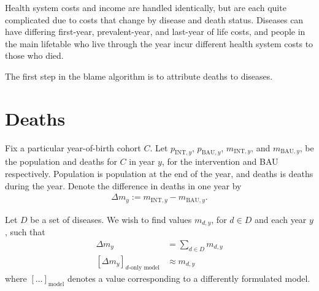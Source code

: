 \documentclass[]{article}
\begin{document}
Health system costs and income are handled identically, but are each quite complicated due to costs that change by disease and death status. Diseases can have differing first-year, prevalent-year, and last-year of life costs, and people in the main lifetable who live through the year incur different health system costs to those who died.

The first step in the blame algorithm is to attribute deaths to diseases.

\section{Deaths}

Fix a particular year-of-birth cohort $C$. Let $p_{\text{INT}, y}$, $p_{\text{BAU}, y}$, $m_{\text{INT}, y}$, and $m_{\text{BAU}, y}$, be the population and deaths for $C$ in year $y$, for the intervention and BAU respectively. Population is population at the end of the year, and deaths is deaths during the year. Denote the difference in deaths in one year by
\begin{align*}
	\Delta m_y := m_{\text{INT}, y} - m_{\text{BAU}, y}.
\end{align*}

Let $D$ be a set of diseases. We wish to find values $m_{d, y}$, for $d \in D$ and each year $y$, such that
\begin{align*}
	\Delta m_y &= \sum_{d \in D} m_{d, y} \\
	[\Delta m_y]_\text{$d$-only model} &\approx m_{d, y}
\end{align*}
where $[\ldots]_\text{model}$ denotes a value corresponding to a differently formulated model.
\end{document}
